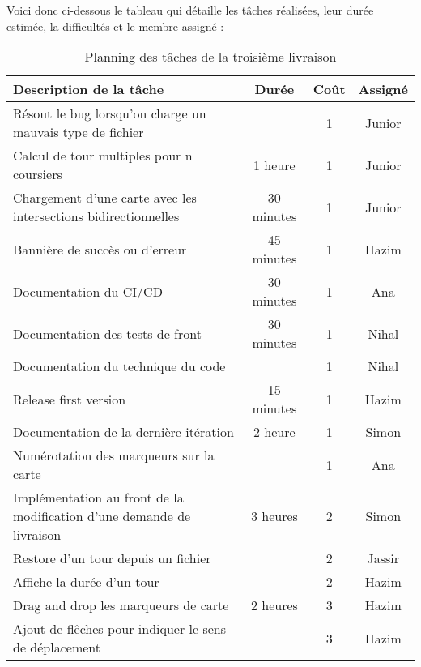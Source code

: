 \documentclass[a4paper]{article}
\begin{document}
Voici donc ci-dessous le tableau qui détaille les tâches réalisées, leur durée estimée, la difficultés et le membre assigné :
\begin{table}[H]
\centering
\begin{tabularx}{\textwidth}{|X|c|c|c|}
\hline
\textbf{Description de la tâche} & \textbf{Durée} & \textbf{Coût} & \textbf{Assigné} \\ \hline
Résout le bug lorsqu'on charge un mauvais type de fichier &  & 1 & Junior \\ \hline
Calcul de tour multiples pour n coursiers & 1 heure & 1 & Junior \\ \hline
Chargement d'une carte avec les intersections bidirectionnelles & 30 minutes & 1 & Junior \\ \hline
Bannière de succès ou d'erreur & 45 minutes & 1 & Hazim \\ \hline
Documentation du CI/CD & 30 minutes & 1 & Ana \\ \hline
Documentation des tests de front & 30 minutes & 1 & Nihal \\ \hline
Documentation du technique du code &  & 1 & Nihal \\ \hline
Release first version & 15 minutes & 1 & Hazim \\ \hline
Documentation de la dernière itération & 2 heure & 1 & Simon \\ \hline
Numérotation des marqueurs sur la carte &  & 1 & Ana \\ \hline
Implémentation au front de la modification d'une demande de livraison & 3 heures & 2 & Simon \\ \hline
Restore d'un tour depuis un fichier &  & 2 & Jassir \\ \hline
Affiche la durée d'un tour &  & 2 & Hazim \\ \hline
Drag and drop les marqueurs de carte & 2 heures & 3 & Hazim \\ \hline
Ajout de flêches pour indiquer le sens de déplacement &  & 3 & Hazim \\ \hline
\end{tabularx}
\caption{Planning des tâches de la troisième livraison}
\end{table}
\end{document}
